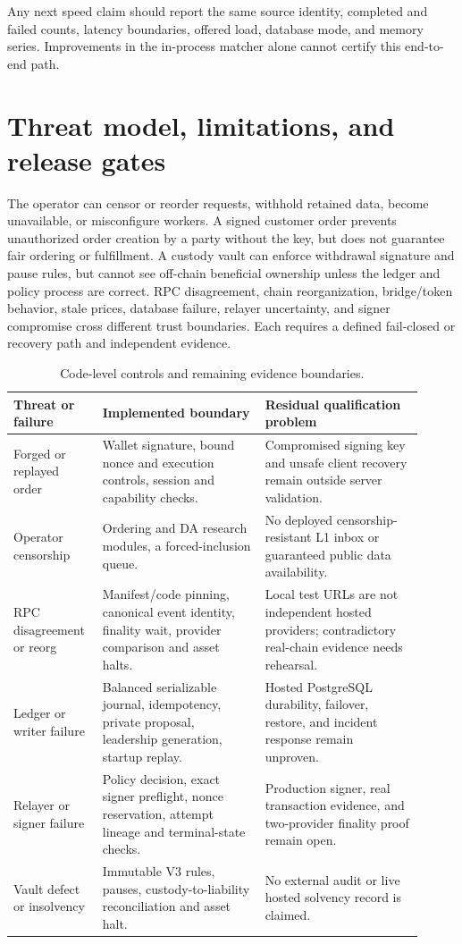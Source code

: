 \documentclass[envcountsame,runningheads,notitlepage]{llncs}
\begin{document}
Any next speed claim should report the same source identity, completed and failed counts, latency boundaries, offered load, database mode, and memory series. Improvements in the in-process matcher alone cannot certify this end-to-end path.

\section{Threat model, limitations, and release gates}
The operator can censor or reorder requests, withhold retained data, become unavailable, or misconfigure workers. A signed customer order prevents unauthorized order creation by a party without the key, but does not guarantee fair ordering or fulfillment. A custody vault can enforce withdrawal signature and pause rules, but cannot see off-chain beneficial ownership unless the ledger and policy process are correct. RPC disagreement, chain reorganization, bridge/token behavior, stale prices, database failure, relayer uncertainty, and signer compromise cross different trust boundaries. Each requires a defined fail-closed or recovery path and independent evidence.

\begin{table}[h]
\centering\small
\begin{tabular}{p{0.18\linewidth}p{0.37\linewidth}p{0.36\linewidth}}
\toprule
Threat or failure & Implemented boundary & Residual qualification problem \\
\midrule
Forged or replayed order & Wallet signature, bound nonce and execution controls, session and capability checks. & Compromised signing key and unsafe client recovery remain outside server validation. \\
Operator censorship & Ordering and DA research modules, a forced-inclusion queue. & No deployed censorship-resistant L1 inbox or guaranteed public data availability. \\
RPC disagreement or reorg & Manifest/code pinning, canonical event identity, finality wait, provider comparison and asset halts. & Local test URLs are not independent hosted providers; contradictory real-chain evidence needs rehearsal. \\
Ledger or writer failure & Balanced serializable journal, idempotency, private proposal, leadership generation, startup replay. & Hosted PostgreSQL durability, failover, restore, and incident response remain unproven. \\
Relayer or signer failure & Policy decision, exact signer preflight, nonce reservation, attempt lineage and terminal-state checks. & Production signer, real transaction evidence, and two-provider finality proof remain open. \\
Vault defect or insolvency & Immutable V3 rules, pauses, custody-to-liability reconciliation and asset halt. & No external audit or live hosted solvency record is claimed. \\
\bottomrule
\end{tabular}
\caption{Code-level controls and remaining evidence boundaries.}
\end{table}
\end{document}
